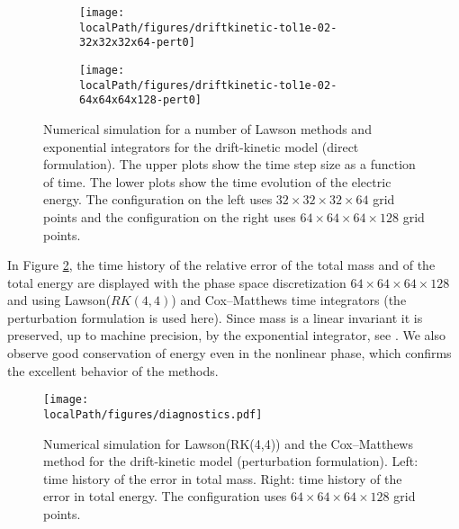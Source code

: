 \begin{figure}[h]
	\centering
	\begin{subfigure}[b]{0.48\textwidth}
        \centering \texttt{[image: \\localPath/figures/driftkinetic-tol1e-02-32x32x32x64-pert0]}%
	\end{subfigure}
	\begin{subfigure}[b]{0.48\textwidth}
         \centering \texttt{[image: \\localPath/figures/driftkinetic-tol1e-02-64x64x64x128-pert0]}%
	\end{subfigure}
	\caption{Numerical simulation for a number of Lawson methods and exponential integrators for the drift-kinetic model (direct formulation). The upper plots show the time step size as a function of time. The lower plots show the time evolution of the electric energy. The configuration on the left uses $32 \times 32 \times 32 \times 64$ grid points and the configuration on the right uses $64 \times 64 \times 64 \times 128$ grid points.}\label{fig:driftkinetic-pert0}
\end{figure}

In Figure \ref{fig:mass_energy}, the time history of the relative error of the total mass and of the total energy 
are displayed with the phase space discretization $64\times 64\times 64\times 128$ and 
using Lawson($RK(4,4)$) and Cox--Matthews time integrators (the perturbation formulation is used here). Since mass is a linear invariant it is preserved, up to machine precision, by the exponential integrator, see \cite{Einkemmer:2015}. We also observe good conservation of energy even in the nonlinear phase, which confirms the excellent behavior of the methods. 

\begin{figure}[h]
	\centering
        \centering \texttt{[image: \\localPath/figures/diagnostics.pdf]}
    \caption{Numerical simulation for Lawson(RK(4,4)) and the Cox--Matthews method for the drift-kinetic model (perturbation formulation). Left: time history of the error in total mass. 
	Right: time history of the error in total energy. The configuration uses  $64 \times 64 \times 64 \times 128$ grid points.}
	\label{fig:mass_energy}
\end{figure}


